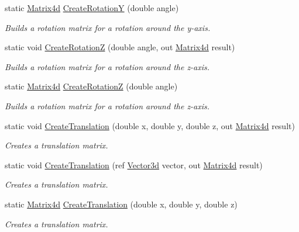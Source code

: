 \begin{DoxyCompactItemize}
static \hyperlink{struct_open_t_k_1_1_matrix4d}{Matrix4d} \hyperlink{struct_open_t_k_1_1_matrix4d_af3d8d2901b890a88060725d9bfbabab3}{Create\-Rotation\-Y} (double angle)
\begin{DoxyCompactList}\small\item\em Builds a rotation matrix for a rotation around the y-\/axis. \end{DoxyCompactList}\item 
static void \hyperlink{struct_open_t_k_1_1_matrix4d_aedfce689042b864a768d4c55ebc99f75}{Create\-Rotation\-Z} (double angle, out \hyperlink{struct_open_t_k_1_1_matrix4d}{Matrix4d} result)
\begin{DoxyCompactList}\small\item\em Builds a rotation matrix for a rotation around the z-\/axis. \end{DoxyCompactList}\item 
static \hyperlink{struct_open_t_k_1_1_matrix4d}{Matrix4d} \hyperlink{struct_open_t_k_1_1_matrix4d_a319fa624b2fa89f3af079ecb6d1966aa}{Create\-Rotation\-Z} (double angle)
\begin{DoxyCompactList}\small\item\em Builds a rotation matrix for a rotation around the z-\/axis. \end{DoxyCompactList}\item 
static void \hyperlink{struct_open_t_k_1_1_matrix4d_a72c89e2f23ce1a33c6ca426eaa56aace}{Create\-Translation} (double x, double y, double z, out \hyperlink{struct_open_t_k_1_1_matrix4d}{Matrix4d} result)
\begin{DoxyCompactList}\small\item\em Creates a translation matrix. \end{DoxyCompactList}\item 
static void \hyperlink{struct_open_t_k_1_1_matrix4d_a4887e55c032a08dec385464d66de21d2}{Create\-Translation} (ref \hyperlink{struct_open_t_k_1_1_vector3d}{Vector3d} vector, out \hyperlink{struct_open_t_k_1_1_matrix4d}{Matrix4d} result)
\begin{DoxyCompactList}\small\item\em Creates a translation matrix. \end{DoxyCompactList}\item 
static \hyperlink{struct_open_t_k_1_1_matrix4d}{Matrix4d} \hyperlink{struct_open_t_k_1_1_matrix4d_ab960caf9ad046a7c8fa8f67d46377ce6}{Create\-Translation} (double x, double y, double z)
\begin{DoxyCompactList}\small\item\em Creates a translation matrix. \end{DoxyCompactList}\item 

\end{DoxyCompactItemize}

